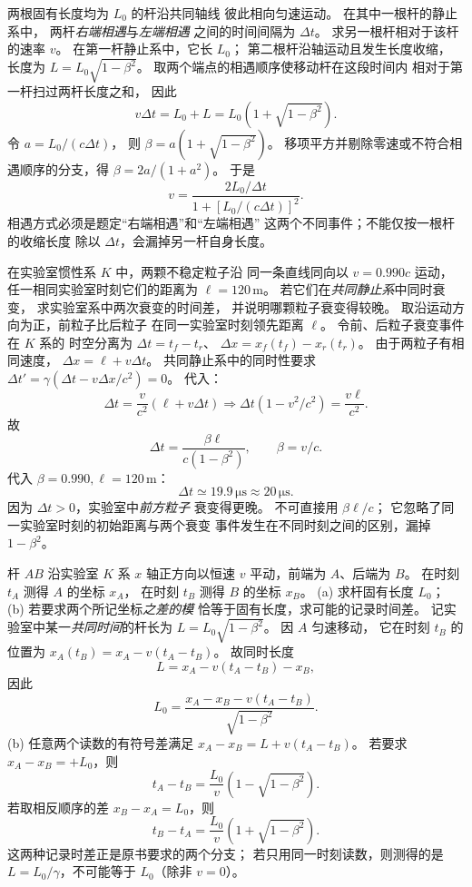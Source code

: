 两根固有长度均为 $L_0$ 的杆沿共同轴线
彼此相向匀速运动。
在其中一根杆的静止系中，
两杆\emph{右端相遇}与\emph{左端相遇}
之间的时间间隔为 $\Delta t$。
求另一根杆相对于该杆的速率 $v$。
\exsolution
在第一杆静止系中，它长 $L_0$；
第二根杆沿轴运动且发生长度收缩，
长度为 $L=L_0\sqrt{1-\beta^2}$。
取两个端点的相遇顺序使移动杆在这段时间内
相对于第一杆扫过两杆长度之和，
因此
\[
v\Delta t=L_0+L
=L_0(1+\sqrt{1-\beta^2}).
\]
令 $a=L_0/(c\Delta t)$，
则 $\beta=a(1+\sqrt{1-\beta^2})$。
移项平方并剔除零速或不符合相遇顺序的分支，得
$\beta=2a/(1+a^2)$。
于是
\[
\boxed{v=\frac{2L_0/\Delta t}{
1+[L_0/(c\Delta t)]^2}}.
\]
\excheck 相遇方式必须是题定“右端相遇”和“左端相遇”
这两个不同事件；不能仅按一根杆的收缩长度
除以 $\Delta t$，会漏掉另一杆自身长度。

在实验室惯性系 $K$ 中，两颗不稳定粒子沿
同一条直线同向以 $v=0.990c$ 运动，
任一相同实验室时刻它们的距离为 $\ell=120\,\mathrm m$。
若它们在\emph{共同静止系}中同时衰变，
求实验室系中两次衰变的时间差，
并说明哪颗粒子衰变得较晚。
\exsolution
取沿运动方向为正，前粒子比后粒子
在同一实验室时刻领先距离 $\ell$。
令前、后粒子衰变事件在 $K$ 系的
时空分离为 $\Delta t=t_f-t_r$、
$\Delta x=x_f(t_f)-x_r(t_r)$。
由于两粒子有相同速度，
$\Delta x=\ell+v\Delta t$。
共同静止系中的同时性要求
$\Delta t'=\gamma(\Delta t-v\Delta x/c^2)=0$。
代入：
\[
\Delta t=\frac v{c^2}(\ell+v\Delta t)
\Longrightarrow
\Delta t(1-v^2/c^2)=\frac{v\ell}{c^2}.
\]
故
\[
\boxed{\Delta t=\frac{\beta\ell}{c(1-\beta^2)}}
,\qquad\beta=v/c.
\]
代入 $\beta=0.990,\ell=120\,\mathrm m$：
\[
\boxed{\Delta t\simeq19.9\,\mathrm{\mu s}
\approx20\,\mathrm{\mu s}}.
\]
因为 $\Delta t>0$，实验室中\emph{前方粒子}
衰变得更晚。
\excheck 不可直接用 $\beta\ell/c$；
它忽略了同一实验室时刻的初始距离与两个衰变
事件发生在不同时刻之间的区别，漏掉 $1-\beta^2$。

杆 $AB$ 沿实验室 $K$ 系 $x$ 轴正方向以恒速 $v$
平动，前端为 $A$、后端为 $B$。
在时刻 $t_A$ 测得 $A$ 的坐标 $x_A$，
在时刻 $t_B$ 测得 $B$ 的坐标 $x_B$。
(a) 求杆固有长度 $L_0$；
(b) 若要求两个所记坐标\emph{之差的模}
恰等于固有长度，求可能的记录时间差。
\exsolution
记实验室中某一\emph{共同时间}的杆长为
$L=L_0\sqrt{1-\beta^2}$。
因 $A$ 匀速移动，
它在时刻 $t_B$ 的位置为
$x_A(t_B)=x_A-v(t_A-t_B)$。
故同时长度
\[
L=x_A-v(t_A-t_B)-x_B,
\]
因此
\[
\boxed{L_0=
\frac{x_A-x_B-v(t_A-t_B)}{\sqrt{1-\beta^2}}}.
\]
(b) 任意两个读数的有符号差满足
$x_A-x_B=L+v(t_A-t_B)$。
若要求 $x_A-x_B=+L_0$，则
\[
\boxed{t_A-t_B=\frac{L_0}{v}
\left(1-\sqrt{1-\beta^2}\right)}.
\]
若取相反顺序的差
$x_B-x_A=L_0$，则
\[
\boxed{t_B-t_A=\frac{L_0}{v}
\left(1+\sqrt{1-\beta^2}\right)}.
\]
\excheck 这两种记录时差正是原书要求的两个分支；
若只用同一时刻读数，则测得的是
$L=L_0/\gamma$，不可能等于 $L_0$（除非 $v=0$）。


